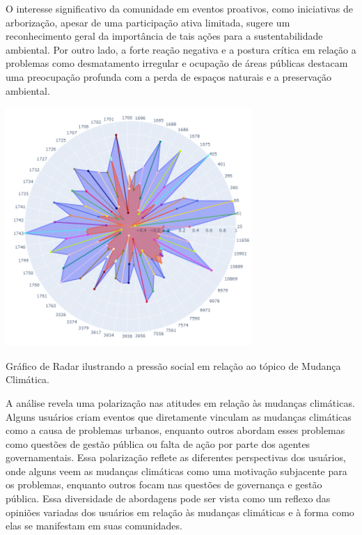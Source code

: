 O interesse significativo da comunidade em eventos proativos, como iniciativas de arborização, apesar de uma participação ativa limitada, sugere um reconhecimento geral da importância de tais ações para a sustentabilidade ambiental. Por outro lado, a forte reação negativa e a postura crítica em relação a problemas como desmatamento irregular e ocupação de áreas públicas destacam uma preocupação profunda com a perda de espaços naturais e a preservação ambiental.

\begin{quadro}[htb]
	\centering
	\includegraphics[width=0.7\textwidth]{images/social_barometer_weather.png}
	\caption{Gráfico de Radar ilustrando a pressão social em relação ao tópico de Mudança Climática.}
	\label{fig:social_barometer_weather}
\end{quadro}

A análise revela uma polarização nas atitudes em relação às mudanças climáticas. Alguns usuários criam eventos que diretamente vinculam as mudanças climáticas como a causa de problemas urbanos, enquanto outros abordam esses problemas como questões de gestão pública ou falta de ação por parte dos agentes governamentais. Essa polarização reflete as diferentes perspectivas dos usuários, onde alguns veem as mudanças climáticas como uma motivação subjacente para os problemas, enquanto outros focam nas questões de governança e gestão pública. Essa diversidade de abordagens pode ser vista como um reflexo das opiniões variadas dos usuários em relação às mudanças climáticas e à forma como elas se manifestam em suas comunidades.

